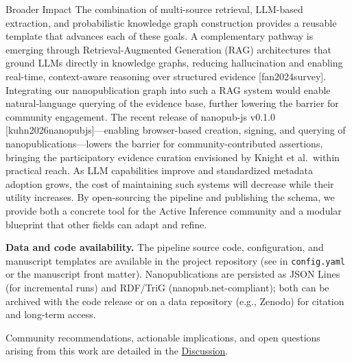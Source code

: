 \documentclass[
  ignorenonframetext,
]{beamer}
\providecommand{\citep}[1]{[#1]}
\begin{document}
\begin{frame}[allowframebreaks]{Broader Impact}
The combination of multi-source retrieval, LLM-based extraction, and
probabilistic knowledge graph construction provides a reusable template
that advances each of these goals. A complementary pathway is emerging
through Retrieval-Augmented Generation (RAG) architectures that ground
LLMs directly in knowledge graphs, reducing hallucination and enabling
real-time, context-aware reasoning over structured evidence
\citep{fan2024survey}. Integrating our nanopublication graph into such a
RAG system would enable natural-language querying of the evidence base,
further lowering the barrier for community engagement. The recent
release of nanopub-js v0.1.0 \citep{kuhn2026nanopubjs}---enabling
browser-based creation, signing, and querying of
nanopublications---lowers the barrier for community-contributed
assertions, bringing the participatory evidence curation envisioned by
Knight et al.~within practical reach. As LLM capabilities improve and
standardized metadata adoption grows, the cost of maintaining such
systems will decrease while their utility increases. By open-sourcing
the pipeline and publishing the schema, we provide both a concrete tool
for the Active Inference community and a modular blueprint that other
fields can adapt and refine.

\textbf{Data and code availability.} The pipeline source code,
configuration, and manuscript templates are available in the project
repository (see  in \texttt{config.yaml} or
the manuscript front matter). Nanopublications are persisted as JSON
Lines (for incremental runs) and RDF/TriG (nanopub.net-compliant); both
can be archived with the code release or on a data repository (e.g.,
Zenodo) for citation and long-term access.

Community recommendations, actionable implications, and open questions
arising from this work are detailed in the
\hyperref[sec:discussion]{Discussion}.
\end{frame}
\end{document}
